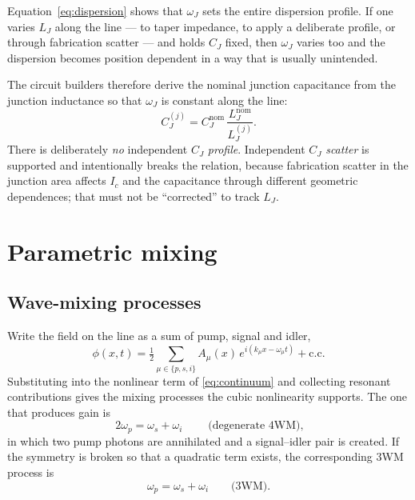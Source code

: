 Equation~\eqref{eq:dispersion} shows that $\omega_J$ sets the entire dispersion
profile. If one varies $L_J$ along the line --- to taper impedance, to apply a
deliberate profile, or through fabrication scatter --- and holds $C_J$ fixed,
then $\omega_J$ varies too and the dispersion becomes position dependent in a
way that is usually unintended.

\begin{implnote}[$C_J$ tracks $L_J$]
The circuit builders therefore derive the nominal junction capacitance from the
junction inductance so that $\omega_J$ is constant along the line:
\[
  C_J^{(j)} = C_J^{\mathrm{nom}}\,\frac{L_J^{\mathrm{nom}}}{L_J^{(j)}} .
\]
There is deliberately \emph{no} independent $C_J$ \emph{profile}. Independent
$C_J$ \emph{scatter} is supported and intentionally breaks the relation, because
fabrication scatter in the junction area affects $I_c$ and the capacitance
through different geometric dependences; that must not be ``corrected'' to track
$L_J$.
\end{implnote}

\section{Parametric mixing}

\subsection{Wave-mixing processes}

Write the field on the line as a sum of pump, signal and idler,
\begin{equation}
  \phi(x,t) = \tfrac{1}{2}\sum_{\mu\in\{p,s,i\}}
  A_\mu(x)\,e^{i(k_\mu x - \omega_\mu t)} + \mathrm{c.c.}
\end{equation}
Substituting into the nonlinear term of \eqref{eq:continuum} and collecting
resonant contributions gives the mixing processes the cubic nonlinearity
supports. The one that produces gain is
\begin{equation}
  \boxed{\;2\omega_p = \omega_s + \omega_i\;}
  \qquad\text{(degenerate 4WM)},
  \label{eq:4wm-energy}
\end{equation}
in which two pump photons are annihilated and a signal--idler pair is created.
If the symmetry is broken so that a quadratic term exists, the corresponding
3WM process is
\begin{equation}
  \omega_p = \omega_s + \omega_i
  \qquad\text{(3WM)}.
  \label{eq:3wm-energy}
\end{equation}

